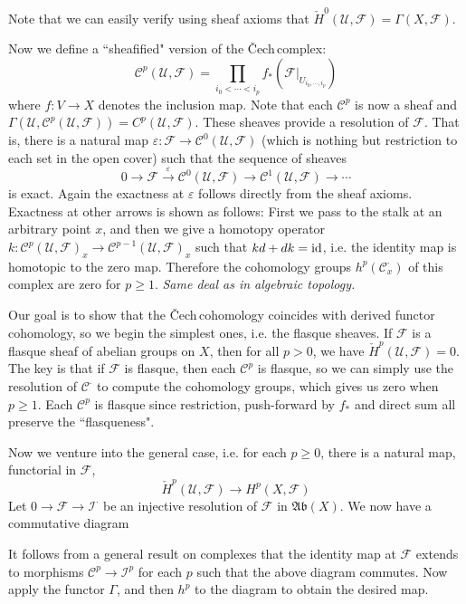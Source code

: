 \documentclass[12pt]{article}
\theoremstyle{plain}
\theoremstyle{definition}
\newcommand{\sU}{\mathcal{U}}
\newcommand{\shC}{\mathscr{C}}
\newcommand{\shF}{\mathscr{F}}
\newcommand{\shI}{\mathscr{I}}
\newcommand{\id}{\rm id}
\newcommand{\<}{\langle}
\renewcommand{\>}{\rangle}
\newcommand{\sm}{\varepsilon}
\newcommand{\Ab}{\mathfrak{Ab}}
\newcommand{\Cech}{\v{C}ech\,}
\newcommand{\cH}{\check{H}}
\begin{document}
Note that we can easily verify using sheaf axioms that $\cH^0(\sU, \shF) = \Gamma(X, \shF)$. 

Now we define a ``sheafified" version of the \Cech complex: 
$$ \shC^p(\sU, \shF)  =  \prod_{i_0 < \cdots < i_p} f_* (\shF|_{U_{i_0, \cdots, i_p}})$$
where $f : V \to X$ denotes the inclusion map. Note that each $\shC^p$ is now a sheaf and $\Gamma(\sU, \shC^p(\sU, \shF)) = C^p(\sU, \shF)$. These sheaves provide a resolution of $\shF$. That is, there is a natural map $\sm : \shF \to \shC^0(\sU, \shF)$ (which is nothing but restriction to each set in the open cover) such that the sequence of sheaves 
$$ 0 \to \shF \stackrel{\sm}{\to} \shC^0(\sU,\shF) \to \shC^1(\sU,\shF) \to \cdots $$
is exact. Again the exactness at $\sm$ follows directly from the sheaf axioms. Exactness at other arrows is shown as follows: First we pass to the stalk at an arbitrary point $x$, and then we give a homotopy operator $k : \shC^p(\sU, \shF)_x \to \shC^{p - 1}(\sU, \shF)_x$ such that $kd + dk = \id$, i.e. the identity map is homotopic to the zero map. Therefore the cohomology groups $h^p(\shC_x^\cdot)$ of this complex are zero for $p \ge 1$. \textit{Same deal as in algebraic topology.}

Our goal is to show that the \Cech cohomology coincides with derived functor cohomology, so we begin the simplest ones, i.e. the flasque sheaves. If $\shF$ is a flasque sheaf of abelian groups on $X$, then for all $p > 0$, we have $\cH^p(\sU, \shF) = 0$. The key is that if $\shF$ is flasque, then each $\shC^p$ is flasque, so we can simply use the resolution of $\shC^\cdot$ to compute the cohomology groups, which gives us zero when $p \ge 1$. Each $\shC^p$ is flasque since restriction, push-forward by $f_*$ and direct sum all preserve the ``flasqueness". 

Now we venture into the general case, i.e. for each $p \ge 0$, there is a natural map, functorial in $\shF$, 
$$ \cH^p (\sU, \shF) \to H^p(X, \shF)$$
Let $0 \to \shF \to \shI^\cdot$ be an injective resolution of $\shF$ in $\Ab(X)$. We now have a commutative diagram 

\begin{center}
\end{center}
It follows from a general result on complexes that the identity map at $\shF$ extends to morphisms $\shC^p \to \shI^p$ for each $p$ such that the above diagram commutes. Now apply the functor $\Gamma$, and then $h^p$ to the diagram to obtain the desired map. 
\end{document}
